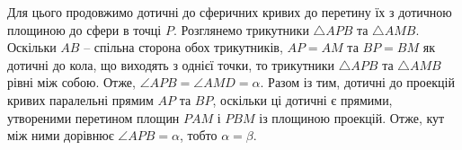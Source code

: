 \begin{solution}
    
    
    Для цього продовжимо дотичні до сферичних кривих до перетину їх з дотичною площиною до сфери в точці $P$. Розглянемо трикутники $\triangle APB$ та $\triangle AMB$. Оскільки $AB$ -- спільна сторона обох трикутників, $AP = AM$ та $BP = BM$ як дотичні до кола, що виходять з однієї точки, то трикутники $\triangle APB$ та $\triangle AMB$ рівні між собою. Отже, $\angle APB = \angle AMD = \alpha$. Разом із тим, дотичні до проекцій кривих паралельні прямим $AP$ та $BP$, оскільки ці дотичні є прямими, утвореними перетином площин $PAM$ і $PBM$ із площиною проекцій. Отже, кут між ними дорівнює $\angle APB = \alpha$, тобто $\alpha = \beta$.
\end{solution}